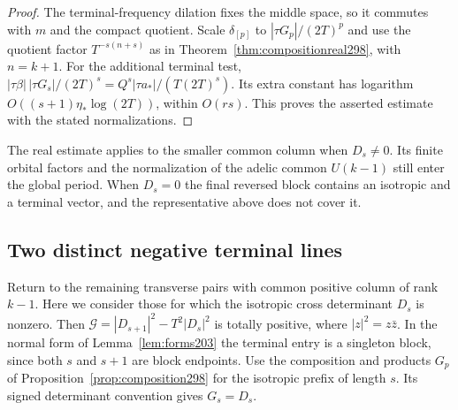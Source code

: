 \documentclass[a4paper,11pt]{article}
\theoremstyle{definition}
\theoremstyle{remark}
\numberwithin{equation}{section}
\begin{document}
\begin{proof}
The terminal-frequency dilation fixes the middle space,
so it commutes with \(m\) and the compact quotient.
Scale \(\delta_{[p]}\) to \(|\tau G_p|/(2T)^p\) and
use the quotient factor \(T^{-s(n+s)}\) as in
Theorem~\ref{thm:compositionreal298}, with \(n=k+1\).
For the additional terminal test,
\(|\tau\beta|\,|\tau G_s|/(2T)^s
=Q^s|\tau a_*|/(T(2T)^s)\).
Its extra constant has logarithm \(O((s+1)\eta_*\log(2T))\),
within \(O(rs)\). This proves the asserted estimate with
the stated normalizations.
\end{proof}

The real estimate applies to the smaller common column when
\(D_s\ne0\). Its finite orbital factors and the normalization
of the adelic common \(U(k-1)\) still enter the global period.
When \(D_s=0\) the final reversed block contains an isotropic
and a terminal vector, and the representative above does not
cover it.

\subsection{Two distinct negative terminal lines}\label{nav:VI-56}
Return to the remaining transverse pairs with common positive
column of rank \(k-1\). Here we consider those for which the
isotropic cross determinant \(D_s\) is nonzero. Then
\(\mathcal G=|D_{s+1}|^2-T^2|D_s|^2\) is totally positive,
where \(|z|^2=z\bar z\). In the normal form of
Lemma~\ref{lem:forms203} the terminal entry is a singleton
block, since both \(s\) and \(s+1\) are block endpoints.
Use the composition and products \(G_p\) of
Proposition~\ref{prop:composition298} for the isotropic
prefix of length \(s\). Its signed determinant convention
gives \(G_s=D_s\).
\end{document}
